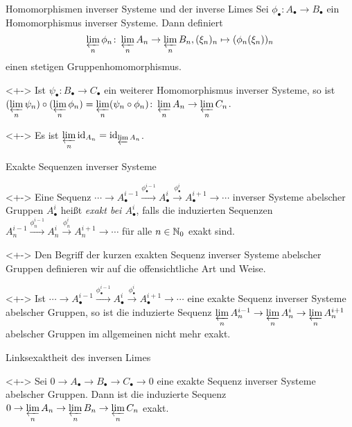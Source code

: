 \begin{frame}{Homomorphismen inverser Systeme und der inverse Limes}
	Sei \(\phi_\bullet\colon A_\bullet \to B_\bullet\) ein Homomorphismus inverser Systeme. Dann definiert
	\[
		\varprojlim\limits_n \phi_n\colon \varprojlim\limits_n A_n \to \varprojlim\limits_n B_n,
		(\xi_n)_n \mapsto (\phi_n(\xi_n))_n
	\]
	einen stetigen Gruppenhomomorphismus.
	\begin{example}<+->
		Ist \(\psi_\bullet\colon B_\bullet \to C_\bullet\) ein weiterer Homomorphismus inverser Systeme,
		so ist
		\((\varprojlim\limits_n \psi_n) \circ (\varprojlim\limits_n \phi_n) = \varprojlim\limits_n (\psi_n \circ \phi_n)\colon
		\varprojlim\limits_n A_n \to \varprojlim\limits_n C_n\).
	\end{example}
	\begin{example}<+->
		Es ist \(\varprojlim\limits_n \operatorname{id}_{A_n} = \operatorname{id}_{\varprojlim\limits A_n}\).
	\end{example}
\end{frame}

\begin{frame}{Exakte Sequenzen inverser Systeme}
	\begin{definition}<+->
		Eine Sequenz \(\dotsb \to A_\bullet^{i - 1} \xrightarrow{\phi_\bullet^{i - 1}} A_\bullet^i \xrightarrow{\phi_\bullet^i}
		A_\bullet^{i + 1} \to \dotsb\) inverser Systeme abelscher Gruppen \(A_\bullet^i\)
		heißt \emph{exakt bei \(A_\bullet^i\)},
		falls die induzierten Sequenzen \(A_n^{i - 1} \xrightarrow{\phi_n^{i - 1}} A_n^i \xrightarrow{\phi_n^i} A_n^{i + 1} \to \dotsb\)
		für alle \(n \in \mathbb N_0\) exakt sind.
	\end{definition}
	\begin{visibleenv}<+->
		Den Begriff der kurzen exakten Sequenz inverser Systeme abelscher Gruppen definieren wir auf die offensichtliche Art
		und Weise.
	\end{visibleenv}
	\begin{remark}<+->
		Ist \(\dotsb \to A_\bullet^{i - 1} \xrightarrow{\phi_\bullet^{i - 1}} A_\bullet^i \xrightarrow{\phi_\bullet^i}
		A_\bullet^{i + 1} \to \dotsb\) eine exakte Sequenz inverser Systeme abelscher Gruppen, so ist die
		induzierte Sequenz
		\(\varprojlim\limits_n A_n^{i - 1} \to \varprojlim\limits_n A_n^i \to \varprojlim\limits_n A_n^{i + 1}\)
		abelscher Gruppen im allgemeinen nicht mehr exakt.
	\end{remark}
\end{frame}

\begin{frame}{Linksexaktheit des inversen Limes}
	\begin{proposition}<+->
		Sei \(0 \to A_\bullet \to B_\bullet \to C_\bullet \to 0\) eine exakte Sequenz inverser Systeme abelscher Gruppen. Dann
		ist die induzierte Sequenz \(0 \to \varprojlim\limits_n A_n \to \varprojlim\limits_n B_n \to \varprojlim\limits_n C_n\)
		exakt.
	\end{proposition}
\end{frame}


